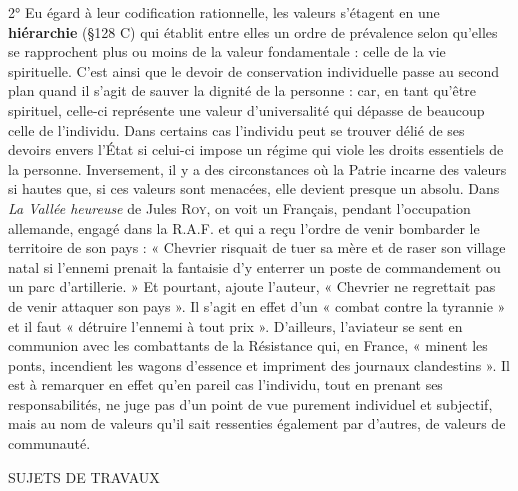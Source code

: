 2° Eu égard à leur codification rationnelle, les valeurs s’étagent en
une {\bf hiérarchie} (\S 128 C) qui établit entre elles un ordre de prévalence
selon qu’elles se rapprochent plus ou moins de la valeur fondamentale :
celle de la vie spirituelle. C’est ainsi que le devoir de conservation
individuelle passe au second plan quand il s’agit de sauver la dignité
de la personne : car, en tant qu'être spirituel, celle-ci représente une
valeur d’universalité qui dépasse de beaucoup celle de l'individu.
Dans certains cas l’individu peut se trouver délié de ses devoirs envers
l’État si celui-ci impose un régime qui viole les droits essentiels de la
personne. Inversement, il y a des circonstances où la Patrie incarne
des valeurs si hautes que, si ces valeurs sont menacées, elle devient
presque un absolu. Dans {\it La Vallée heureuse} de Jules \textsc{Roy}, on voit un
Français, pendant l'occupation allemande, engagé dans la R.A.F.
et qui a reçu l’ordre de venir bombarder le territoire de son pays :
« Chevrier risquait de tuer sa mère et de raser son village natal si
l’ennemi prenait la fantaisie d’y enterrer un poste de commandement
ou un parc d'artillerie. » Et pourtant, ajoute l’auteur, « Chevrier ne
regrettait pas de venir attaquer son pays ». Il s’agit en effet d’un
« combat contre la tyrannie » et il faut « détruire l’ennemi à tout prix ».
D'ailleurs, l’aviateur se sent en communion avec les combattants de
la Résistance qui, en France, « minent les ponts, incendient les wagons
d’essence et impriment des journaux clandestins ». Il est à remarquer
en effet qu’en pareil cas l'individu, tout en prenant ses responsabilités,
ne juge pas d’un point de vue purement individuel et subjectif,
mais au nom de valeurs qu’il sait ressenties également par d’autres,
de valeurs de communauté.

SUJETS DE TRAVAUX

